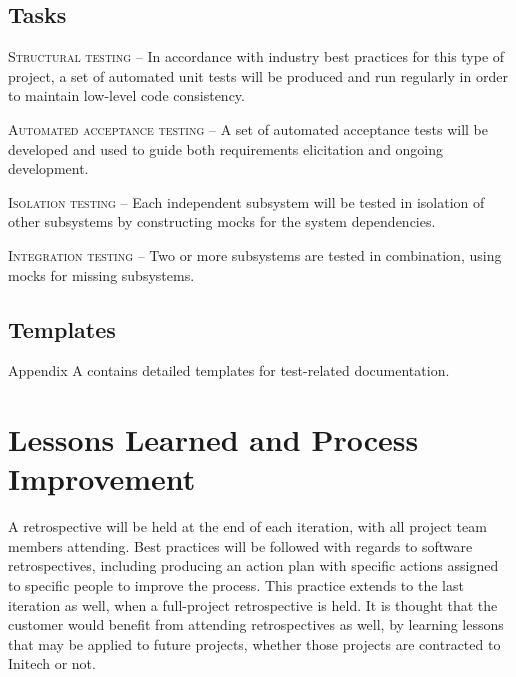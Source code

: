 \documentclass[11pt]{wacomepd}
\begin{document}
\section {Tasks}
\textsc{Structural testing} -- In accordance with industry best practices for this type of project,
a set of automated unit tests will be produced and run regularly in order to maintain low-level code
consistency.

\textsc{Automated acceptance testing} -- A set of automated acceptance tests will be developed and
used to guide both requirements elicitation and ongoing development.

\textsc{Isolation testing} -- Each independent subsystem will be tested in isolation of other
subsystems by constructing mocks for the system dependencies.

\textsc{Integration testing} -- Two or more subsystems are tested in combination, using mocks for
missing subsystems.


\section{Templates}
Appendix A contains detailed templates for test-related documentation.

\chapter{Lessons Learned and Process Improvement}

A retrospective will be held at the end of each iteration, with all project team members attending.
Best practices will be followed with regards to software retrospectives, including producing an
action plan with specific actions assigned to specific people to improve the process.  This practice
extends to the last iteration as well, when a full-project retrospective is held.  It is thought
that the customer would benefit from attending retrospectives as well, by learning lessons that may
be applied to future projects, whether those projects are contracted to Initech or not.
\end{document}
